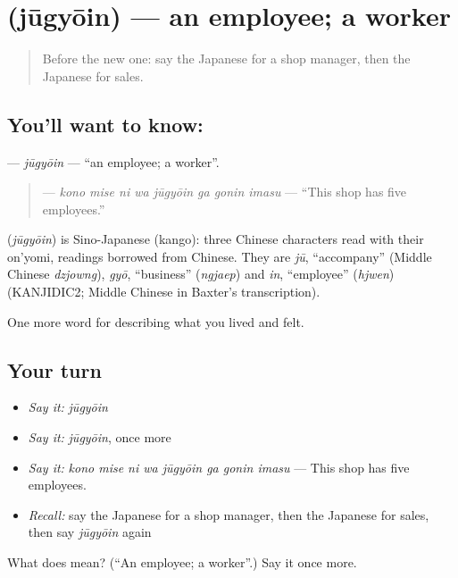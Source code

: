 \section[\texorpdfstring{\ja{じゅうぎょういん} (jūgyōin)}{じゅうぎょういん (jūgyōin)}]{ (jūgyōin) — an employee; a worker}

\label{lesson:JA-C487-juugyouin}



\begin{quote}
Before the new one: say the Japanese for a shop manager, then the Japanese for sales.
\end{quote}

\subsection*{You'll want to know: }
\textbf{} — \emph{jūgyōin} — \textquotedblleft{}an employee; a worker\textquotedblright{}.

\begin{quote}
\textbf{    } — \emph{kono mise ni wa jūgyōin ga gonin imasu} — \textquotedblleft{}This shop has five employees.\textquotedblright{}
\end{quote}

\begin{cousinweb}
\textbf{} (\emph{jūgyōin}) is Sino-Japanese (kango): three Chinese characters read with their on'yomi, readings borrowed from Chinese. They are \emph{jū}, \textquotedblleft{}accompany\textquotedblright{} (Middle Chinese \emph{dzjowng}), \emph{gyō}, \textquotedblleft{}business\textquotedblright{} (\emph{ngjaep}) and \emph{in}, \textquotedblleft{}employee\textquotedblright{} (\emph{hjwen}) (KANJIDIC2; Middle Chinese in Baxter's transcription).
\end{cousinweb}

\begin{grammarlens}[title={What you've built}]
One more word for describing what you lived and felt.
\end{grammarlens}

\subsection*{Your turn}
\begin{itemize}
\raggedright
  \item \emph{Say it:} \emph{jūgyōin}
  \item \emph{Say it:} \emph{jūgyōin}, once more
  \item \emph{Say it:} \emph{kono mise ni wa jūgyōin ga gonin imasu} — This shop has five employees.
  \item \emph{Recall:} say the Japanese for a shop manager, then the Japanese for sales, then say \emph{jūgyōin} again
\end{itemize}

\begin{tcolorbox}[breakable,colback=teal!4,colframe=teal!35!black,title={Before you move on}]
What does  mean? (\textquotedblleft{}An employee; a worker\textquotedblright{}.) Say it once more.
\end{tcolorbox}
